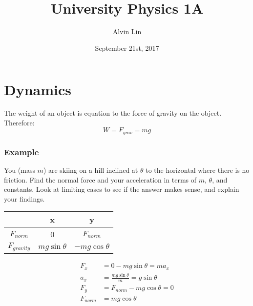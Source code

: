 \documentclass[letterpaper, 12pt]{math}
\title{University Physics 1A}
\author{Alvin Lin}
\date{September 21st, 2017}
\begin{document}
\maketitle

\section*{Dynamics}
The weight of an object is equation to the force of gravity on the object.
Therefore:
\[ W = F_{grav} = mg \]

\subsubsection*{Example}
You (mass \( m \)) are skiing on a hill inclined at \( \theta \) to the
horizontal where there is no friction. Find the normal force and your
acceleration in terms of \( m \), \( \theta \), and constants. Look at limiting
cases to see if the answer makes sense, and explain your findings.
\begin{center}
\end{center}
\begin{center}
  \begin{tabular}{|c|c|c|}
    \hline
    & x & y \\ \hline
    \( F_{norm} \) & 0 & \( F_{norm} \) \\
    \hline
    \( F_{gravity} \) & \( mg\sin\theta \) & \( -mg\cos\theta \) \\ \hline
  \end{tabular}
\end{center}
\begin{align*}
  F_x &= 0-mg\sin\theta = ma_{x} \\
  a_x &= \frac{mg\sin\theta}{m} = g\sin\theta \\
  F_y &= F_{norm}-mg\cos\theta = 0 \\
  F_{norm} &= mg\cos\theta
\end{align*}
\end{document}
